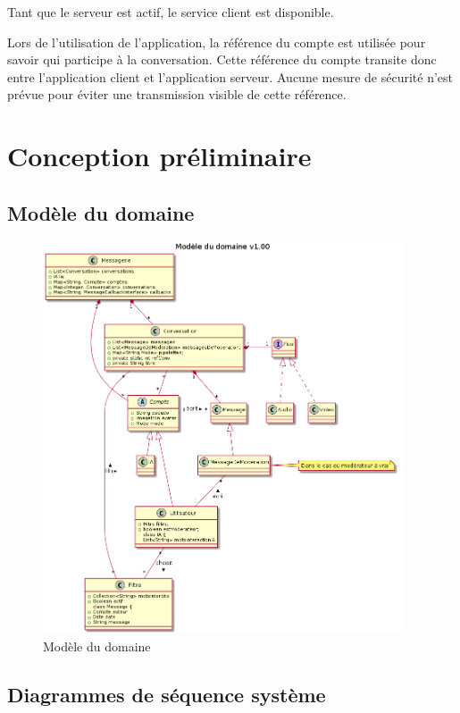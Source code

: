 \documentclass[11pt,dvipsnames,svgnames]{report}
\begin{document}
Tant que le serveur est actif, le service client est disponible.

Lors de l'utilisation de l'application, la référence du compte est utilisée pour savoir qui participe à la conversation. Cette référence du compte transite donc entre l'application client et l'application serveur. Aucune mesure de sécurité n'est prévue pour éviter une transmission visible de cette référence.\\

\chapter{Conception préliminaire}

\section{Modèle du domaine}

\begin{figure}[H]
\caption{Modèle du domaine}
\centerline{\includegraphics[width=0.95\textwidth]{diagrammes/class-diag.png}}
\end{figure}

\section{Diagrammes de séquence système}
\end{document}
